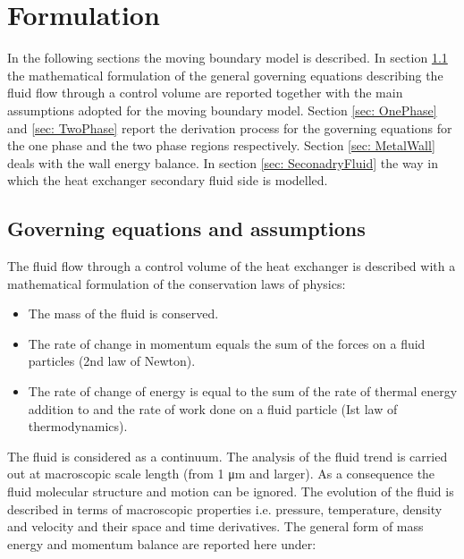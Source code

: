 \documentclass[11pt]{article} %
\begin{document}
\section{Formulation}
In the following sections the moving boundary model is described. In section \ref{sec: Assumptions} the mathematical formulation of the general governing equations describing the fluid flow through a control volume are reported together with the main assumptions adopted for the moving boundary model. Section \ref{sec: OnePhase} and \ref{sec: TwoPhase} report the derivation process for the governing equations for the one phase and the two phase regions respectively. Section \ref{sec: MetalWall} deals with the wall energy balance. In section \ref{sec: SeconadryFluid} the way in which the heat exchanger secondary fluid side is modelled.


\subsection{Governing equations and assumptions}
\label{sec: Assumptions}
The fluid flow through a control volume of the heat exchanger is described with a mathematical formulation of the conservation laws of physics:
\begin{itemize}
\item The mass of the fluid is conserved.
\item The rate of change in momentum equals the sum of the forces on a fluid particles (2nd law of Newton).
\item The rate of change of energy is equal to the sum of the rate of thermal energy addition to and the rate of work done on a fluid particle (Ist law of thermodynamics).
\end{itemize}
The fluid is considered as a continuum. The analysis of the fluid trend is carried out at macroscopic scale length (from 1 \si{\micro m} and larger). As a consequence the fluid molecular structure and motion can be ignored. The evolution of the fluid is described in terms of macroscopic properties i.e. pressure, temperature, density and velocity and their space and time derivatives. The general form of mass energy and momentum balance are reported here under:
 
\end{document}
